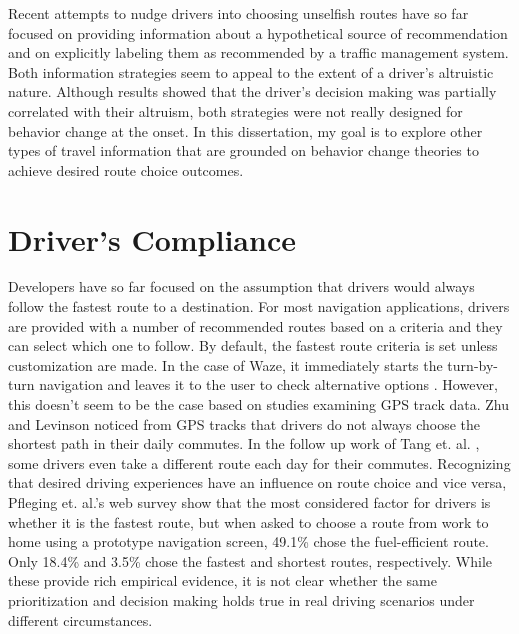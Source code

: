 Recent attempts to nudge drivers into choosing unselfish routes have so far focused on providing information about a hypothetical source of recommendation and on explicitly labeling them as recommended by a traffic management system. Both information strategies seem to appeal to the extent of a driver's altruistic nature. Although results showed that the driver's decision making was partially correlated with their altruism, both strategies were not really designed for behavior change at the onset. In this dissertation, my goal is to explore other types of travel information that are grounded on behavior change theories to achieve desired route choice outcomes. 

\section{Driver's Compliance}
Developers have so far focused on the assumption that drivers would always follow the fastest route to a destination. For most navigation applications, drivers are provided with a number of recommended routes based on a criteria and they can select which one to follow. By default, the fastest route criteria is set unless customization are made. In the case of Waze, it immediately starts the turn-by-turn navigation and leaves it to the user to check alternative options \cite{Levine2014SystemExchange}. However, this doesn't seem to be the case based on studies examining GPS track data. Zhu and Levinson \cite{Zhu2015DoPrinciple} noticed from GPS tracks that drivers do not always choose the shortest path in their daily commutes. In the follow up work of Tang et. al. \cite{Tang2016AnalyzingData}, some drivers even take a different route each day for their commutes. Recognizing that desired driving experiences have an influence on route choice and vice versa, Pfleging et. al.'s \cite{Pfleging2014ExperienceNavigation} web survey show that the most considered factor for drivers is whether it is the fastest route, but when asked to choose a route from work to home using a prototype navigation screen, 49.1\% chose the fuel-efficient route. Only 18.4\% and 3.5\% chose the fastest and shortest routes, respectively. While these provide rich empirical evidence, it is not clear whether the same prioritization and decision making holds true in real driving scenarios under different circumstances.

